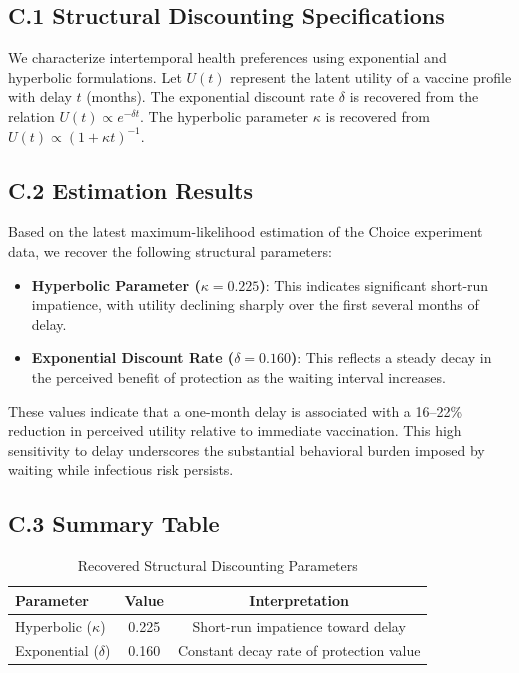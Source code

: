\documentclass[12pt]{article}
\begin{document}
\subsection*{C.1 Structural Discounting Specifications}

We characterize intertemporal health preferences using exponential and hyperbolic 
formulations. Let $U(t)$ represent the latent utility of a vaccine profile with delay 
$t$ (months). The exponential discount rate $\delta$ is recovered from the relation 
$U(t) \propto e^{-\delta t}$. The hyperbolic parameter $\kappa$ is recovered from 
$U(t) \propto (1 + \kappa t)^{-1}$.

\subsection*{C.2 Estimation Results}

Based on the latest maximum-likelihood estimation of the Choice experiment data, we 
recover the following structural parameters:
\begin{itemize}
    \item \textbf{Hyperbolic Parameter ($\kappa = 0.225$)}: This indicates significant 
    short-run impatience, with utility declining sharply over the first several months 
    of delay.
    \item \textbf{Exponential Discount Rate ($\delta = 0.160$)}: This reflects a 
    steady decay in the perceived benefit of protection as the waiting interval increases.
\end{itemize}

These values indicate that a one-month delay is associated with a 16--22\% reduction in 
perceived utility relative to immediate vaccination. This high sensitivity to delay 
underscores the substantial behavioral burden imposed by waiting while infectious risk 
persists.


\subsection*{C.3 Summary Table}

\begin{table}[H]
\centering
\caption{Recovered Structural Discounting Parameters}
\label{tab:discount_rates}
\begin{tabular}{lcc}
\toprule
\textbf{Parameter} & \textbf{Value} & \textbf{Interpretation} \\
\midrule
Hyperbolic ($\kappa$) & 0.225 & Short-run impatience toward delay \\
Exponential ($\delta$) & 0.160 & Constant decay rate of protection value \\
\bottomrule
\end{tabular}
\end{table}

\clearpage
\end{document}
